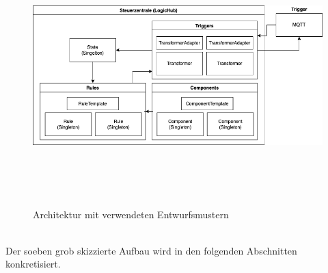         \begin{figure}[hbt!]
            \centering
            \includegraphics[width=14cm,height=10cm,keepaspectratio]{images/final_architecture_with_patterns.png}
            \caption{Architektur mit verwendeten Entwurfsmustern}
            \label{fig:patternarchitektur}
        \end{figure}
        \\
        Der soeben grob skizzierte Aufbau wird in den folgenden Abschnitten konkretisiert.

